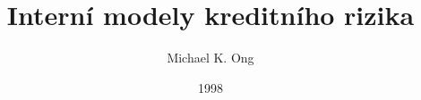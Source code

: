 \documentclass[a4paper]{book}
\begin{document}
\newtheorem{definition}{Definice}[chapter]
\newtheorem{theorem}{Věta}[chapter]
\newtheorem{proof}{Důkaz}[chapter]
\newtheorem{example}{Příklad}[chapter]
\newtheorem{corollary}{Tvrzení}[chapter]


\title{Interní modely kreditního rizika}
\author{Michael K. Ong}
\date{1998}
\maketitle

\tableofcontents









\end{document}

